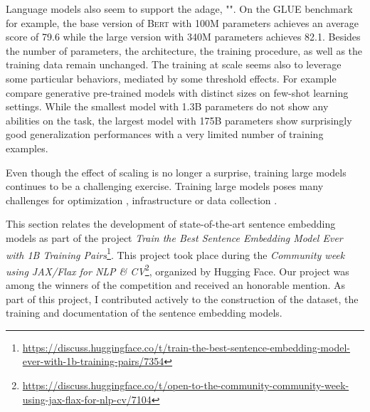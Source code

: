 Language models also seem to support the adage, "". On the GLUE benchmark for example, the base version of \textsc{Bert} with 100M parameters achieves an average score of 79.6 while the large version with 340M parameters achieves 82.1. Besides the number of parameters, the architecture, the training procedure, as well as the training data remain unchanged. The training at scale seems also to leverage some particular behaviors, mediated by some threshold effects. For example \textcite{brown_20} compare generative pre-trained models with distinct sizes on few-shot learning settings. While the smallest model with 1.3B parameters do not show any abilities on the task, the largest model with 175B parameters show surprisingly good generalization performances with a very limited number of training examples.

Even though the effect of scaling is no longer a surprise, training large models continues to be a challenging exercise. Training large models poses many challenges for optimization \parencite{you_20}, infrastructure \parencite{shoeybi_19, narayanan_21} or data collection \parencite{OrtizSuarezSagotRomary2019}. 


This section relates the development of state-of-the-art sentence embedding models as part of the project \textit{Train the Best Sentence Embedding Model Ever with 1B Training Pairs}\footnote{\url{https://discuss.huggingface.co/t/train-the-best-sentence-embedding-model-ever-with-1b-training-pairs/7354}}. This project took place during the \textit{Community week using JAX/Flax for NLP \& CV}\footnote{\url{https://discuss.huggingface.co/t/open-to-the-community-community-week-using-jax-flax-for-nlp-cv/7104}}, organized by Hugging Face. Our project was among the winners of the competition and received an honorable mention. As part of this project, I contributed actively to the construction of the dataset, the training and documentation of the sentence embedding models. 

